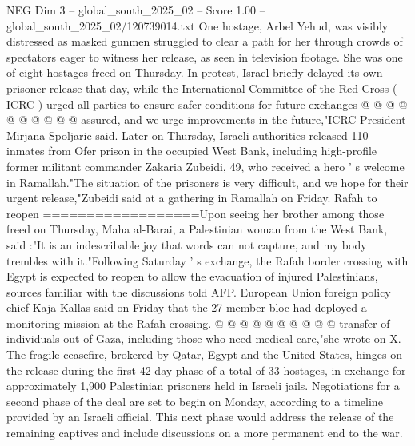 \begin{textsample}{NEG Dim 3 – global\_south\_2025\_02 – Score 1.00 – global\_south\_2025\_02/120739014.txt}
One hostage, Arbel Yehud, was visibly distressed as masked gunmen struggled to clear a path for her through crowds of spectators eager to witness her release, as seen in television footage.
She was one of eight hostages freed on Thursday.
In protest, Israel briefly delayed its own prisoner release that day, while the International Committee of the Red Cross ( ICRC ) urged all parties to ensure safer conditions for future exchanges @ @ @ @ @ @ @ @ @ @ assured, and we urge improvements in the future,"ICRC President Mirjana Spoljaric said.
Later on Thursday, Israeli authorities released 110 inmates from Ofer prison in the occupied West Bank, including high-profile former militant commander Zakaria Zubeidi, 49, who received a hero ' s welcome in Ramallah."The situation of the prisoners is very difficult, and we hope for their urgent release,"Zubeidi said at a gathering in Ramallah on Friday.
Rafah to reopen ==================Upon seeing her brother among those freed on Thursday, Maha al-Barai, a Palestinian woman from the West Bank, said :"It is an indescribable joy that words can not capture, and my body trembles with it."Following Saturday ' s exchange, the Rafah border crossing with Egypt is expected to reopen to allow the evacuation of injured Palestinians, sources familiar with the discussions told AFP.
European Union foreign policy chief Kaja Kallas said on Friday that the 27-member bloc had deployed a monitoring mission at the Rafah crossing. @ @ @ @ @ @ @ @ @ @ transfer of individuals out of Gaza, including those who need medical care,"she wrote on X.
The fragile ceasefire, brokered by Qatar, Egypt and the United States, hinges on the release during the first 42-day phase of a total of 33 hostages, in exchange for approximately 1,900 Palestinian prisoners held in Israeli jails.
Negotiations for a second phase of the deal are set to begin on Monday, according to a timeline provided by an Israeli official.
This next phase would address the release of the remaining captives and include discussions on a more permanent end to the war.

\end{textsample}

